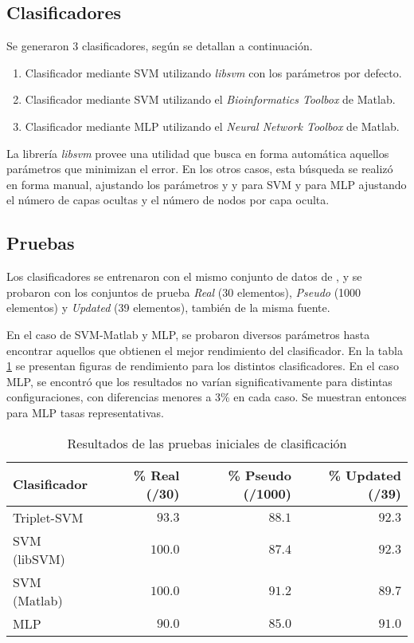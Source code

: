 \documentclass[12pt,bibliography=oldstyle,DIV=12,parskip=half-,titlepage]{scrartcl}
\begin{document}
\subsection{Clasificadores}
Se generaron 3 clasificadores, según se detallan a continuación.
\begin{enumerate}
\item Clasificador mediante SVM utilizando \emph{libsvm}\cite{libsvm} con los
  parámetros por defecto.
\item Clasificador mediante SVM utilizando el \emph{Bioinformatics
  Toolbox} de Matlab.
\item Clasificador mediante MLP utilizando el \emph{Neural Network
  Toolbox} de Matlab.
\end{enumerate}
%
La librería \emph{libsvm}\cite{libsvm} provee una utilidad  que
busca en forma automática aquellos parámetros que minimizan el
error. En los otros casos, esta búsqueda se realizó en forma manual,
ajustando los parámetros  y y  para
SVM y para MLP ajustando el número de capas ocultas y el número de
nodos por capa oculta.
%
\subsection{Pruebas}
Los clasificadores se entrenaron con el mismo conjunto de datos de
\cite{xue}, y se probaron con los conjuntos de prueba \emph{Real} (30
elementos), \emph{Pseudo} (1000 elementos) y \emph{Updated} (39
elementos), también de la misma fuente.

En el caso de SVM-Matlab y MLP, se probaron diversos parámetros hasta
encontrar aquellos que obtienen el mejor rendimiento del clasificador.
En la tabla \ref{testresults} se presentan figuras de rendimiento para
los distintos clasificadores. %
En el caso MLP, se encontró que los resultados no varían
significativamente para distintas configuraciones, con diferencias
menores a 3\% en cada caso.  Se muestran entonces para MLP tasas
representativas.
%
\begin{table}
  \caption{Resultados de las pruebas iniciales de clasificación}
  \center%
  \begin{tabular}{lrrr}\toprule
    Clasificador  & \% Real (/30) &
                     \% Pseudo (/1000) & \% Updated (/39) \\\midrule
    Triplet-SVM   &  $93.3$    & $88.1$     & $92.3$     \\
    SVM (libSVM)  & $100.0$    & $87.4$     & $92.3$     \\
    SVM (Matlab)  & $100.0$    & $91.2$     & $89.7$     \\
    MLP           &  $90.0$    & $85.0$     & $91.0$  \\\bottomrule
  \end{tabular}
  \label{testresults}
\end{table}
%
\end{document}
